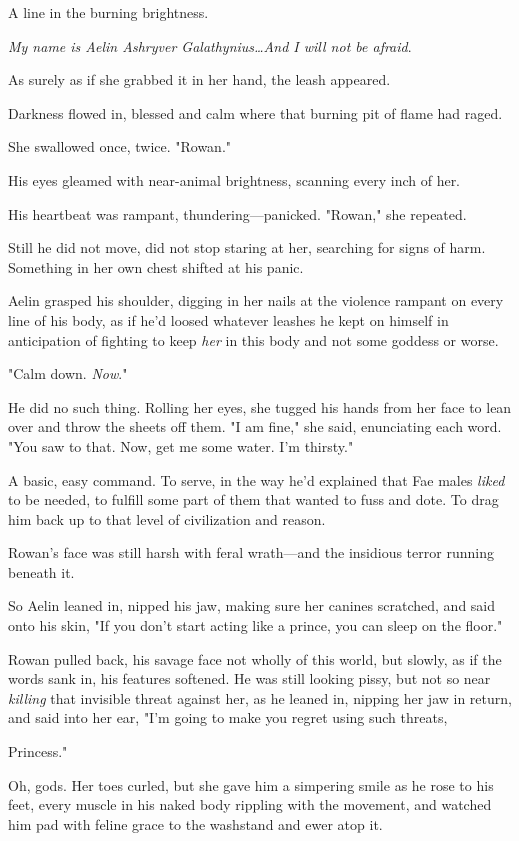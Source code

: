 A line in the burning brightness.

\emph{My name is Aelin Ashryver Galathynius\ldots And I will not be afraid}.

As surely as if she grabbed it in her hand, the leash appeared.

Darkness flowed in, blessed and calm where that burning pit of flame had raged.

She swallowed once, twice.
"Rowan."

His eyes gleamed with near-animal brightness, scanning every inch of her.

His heartbeat was rampant, thundering---panicked.
"Rowan," she repeated.

Still he did not move, did not stop staring at her, searching for signs of harm.
Something in her own chest shifted at his panic.

Aelin grasped his shoulder, digging in her nails at the violence rampant on every line of his body, as if he'd loosed whatever leashes he kept on himself in anticipation of fighting to keep \emph{her} in this body and not some goddess or worse.

"Calm down.
\emph{Now}."

He did no such thing.
Rolling her eyes, she tugged his hands from her face to lean over and throw the sheets off them.
"I am fine," she said, enunciating each word.
"You saw to that.
Now, get me some water.
I'm thirsty."

A basic, easy command.
To serve, in the way he'd explained that Fae males \emph{liked} to be needed, to fulfill some part of them that wanted to fuss and dote.
To drag him back up to that level of civilization and reason.

Rowan's face was still harsh with feral wrath---and the insidious terror running beneath it.

So Aelin leaned in, nipped his jaw, making sure her canines scratched, and said onto his skin, "If you don't start acting like a prince, you can sleep on the floor."

Rowan pulled back, his savage face not wholly of this world, but slowly, as if the words sank in, his features softened.
He was still looking pissy, but not so near \emph{killing} that invisible threat against her, as he leaned in, nipping her jaw in return, and said into her ear, "I'm going to make you regret using such threats,

Princess."

Oh, gods.
Her toes curled, but she gave him a simpering smile as he rose to his feet, every muscle in his naked body rippling with the movement, and watched him pad with feline grace to the washstand and ewer atop it.

